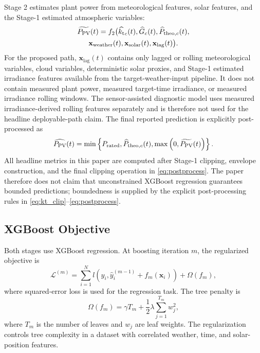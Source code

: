 Stage 2 estimates plant power from meteorological features, solar features, and the Stage-1 estimated atmospheric variables:
\begin{multline}
\widetilde{P_{\mathrm{PV}}}(t)=f_2\bigl(\widehat{k_{\mathrm{t}}}_{c}(t),\widehat{G}_{c}(t),
\widehat{P}_{\mathrm{theo},c}(t),\\
\mathbf{x}_{\mathrm{weather}}(t),\mathbf{x}_{\mathrm{solar}}(t),
\mathbf{x}_{\mathrm{lag}}(t)\bigr).
\label{eq:stage2}
\end{multline}
For the proposed path, $\mathbf{x}_{\mathrm{lag}}(t)$ contains only lagged or rolling meteorological variables, cloud variables, deterministic solar proxies, and Stage-1 estimated irradiance features available from the target-weather-input pipeline. It does not contain measured plant power, measured target-time irradiance, or measured irradiance rolling windows. The sensor-assisted diagnostic model uses measured irradiance-derived rolling features separately and is therefore not used for the headline deployable-path claim.
The final reported prediction is explicitly post-processed as
\begin{equation}
\widehat{P_{\mathrm{PV}}}(t)=\min\left\{P_{\mathrm{rated}},\widehat{P}_{\mathrm{theo},c}(t),
\max\left(0,\widetilde{P_{\mathrm{PV}}}(t)\right)\right\}.
\label{eq:postprocess}
\end{equation}
All headline metrics in this paper are computed after Stage-1 clipping, envelope construction, and the final clipping operation in \eqref{eq:postprocess}. The paper therefore does not claim that unconstrained XGBoost regression guarantees bounded predictions; boundedness is supplied by the explicit post-processing rules in \eqref{eq:kt_clip}--\eqref{eq:postprocess}.

\subsection{XGBoost Objective}

Both stages use XGBoost regression. At boosting iteration $m$, the regularized objective is
\begin{equation}
\mathcal{L}^{(m)} =
\sum_{i=1}^{N} l\left(y_i,\hat{y}_i^{(m-1)}+f_m(\mathbf{x}_i)\right)
+ \Omega(f_m),
\label{eq:xgb_obj}
\end{equation}
where squared-error loss is used for the regression task. The tree penalty is
\begin{equation}
\Omega(f_m)=\gamma T_m+\frac{1}{2}\lambda\sum_{j=1}^{T_m} w_j^2,
\label{eq:xgb_reg}
\end{equation}
where $T_m$ is the number of leaves and $w_j$ are leaf weights. The regularization controls tree complexity in a dataset with correlated weather, time, and solar-position features.

